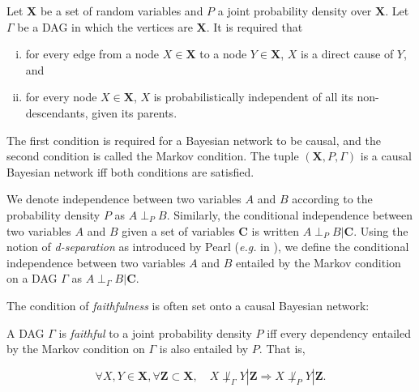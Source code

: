 \begin{definition}

Let $\bm X$ be a set of random variables and $P$ a joint
probability density over $\bm X$. Let $\Gamma$ be a DAG in which the vertices
are $\bm X$. It is required that
\begin{enumerate}[(i)]
    \item for every edge from a node $X\in\bm X$ to a node $Y\in\bm X$, $X$ is a
    direct cause of $Y$, and
    \item for every node $X\in\bm X$, $X$ is probabilistically independent of
    all its non-descendants, given its parents.
\end{enumerate}
The first condition is required for a Bayesian network to be causal, and the
second condition is called the Markov condition. The tuple $(\bm X, P, \Gamma)$
is a causal Bayesian network iff both conditions are satisfied.

\end{definition}

We denote independence between two variables $A$ and $B$ according to the
probability density $P$ as $A\perp_P B$. Similarly, the conditional independence
between two variables $A$ and $B$ given a set of variables $\bm C$ is written
$A\perp_P B|\bm C$. Using the notion of \emph{d-separation} as introduced by
Pearl (\emph{e.g.} in \cite{pearl2002causality}), we define the conditional
independence between two variables $A$ and $B$ entailed by the Markov condition
on a DAG $\Gamma$ as $A\perp_\Gamma B|\bm C$.

The condition of \emph{faithfulness} is often set onto a causal Bayesian
network:

\begin{definition}[Faithfulness]
\label{def:faith}

A DAG $\Gamma$ is \emph{faithful} to a joint probability density $P$ iff every
dependency entailed by the Markov condition on $\Gamma$ is also
entailed by $P$. That is,

\begin{equation}
\forall X, Y\in\bm X,\forall \bm Z\subset\bm X,\quad
X\not\perp_\Gamma Y|\bm Z\Rightarrow X\not\perp_P Y|\bm Z.
\end{equation}

\end{definition}

